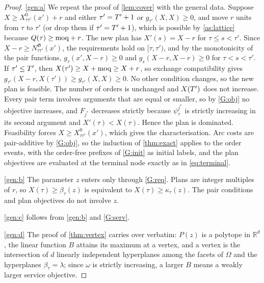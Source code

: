 \begin{proof}
  \ref{gen:a} We repeat the proof of \cref{lem:cover} with the general data. Suppose
  $X\ge X^0_{\tau\tau'}(x')+r$ and either $\tau'=T'+1$ or $g_{\tau'}(X,X)\ge0$, and move $r$
  units from $\tau$ to $\tau'$ (or drop them if $\tau'=T'+1$), which is possible by
  \cref{as:lattice} because $Q(\tau)\ge\mathrm{moq}+r$. The new plan has $X'(s)=X-r$ for
  $\tau\le s<\tau'$. Since $X-r\ge N^{\mathfrak{G}}_{\tau\tau'}(x')$, the requirements hold on
  $[\tau,\tau')$, and by the monotonicity of the pair functions,
  $g_\tau(x',X-r)\ge0$ and $g_s(X-r,X-r)\ge0$ for $\tau<s<\tau'$. If $\tau'\le T'$, then
  $X(\tau')\ge X+\mathrm{moq}\ge X+r$, so exchange compatibility gives
  $g_{\tau'}(X-r,X(\tau'))\ge g_{\tau'}(X,X)\ge0$. No other condition changes, so the new plan
  is feasible. The number of orders is unchanged and $X(T')$ does not increase. Every pair
  term involves arguments that are equal or smaller, so by \ref{G:obj} no objective
  increases, and $F_{j^\ast}$ decreases strictly because $\psi^{j^\ast}_\tau$ is strictly
  increasing in its second argument and $X'(\tau)<X(\tau)$. Hence the plan is dominated.
  Feasibility forces $X\ge X^0_{\tau\tau'}(x')$, which gives the characterisation. Arc costs
  are pair-additive by \ref{G:obj}, so the induction of \cref{thm:exact} applies to the order
  events, with the order-free prefixes of \ref{G:init} as initial labels, and the plan
  objectives are evaluated at the terminal node exactly as in \eqref{eq:terminal}.

  \ref{gen:b} The parameter $z$ enters only through \ref{G:req}. Plans are integer multiples
  of $r$, so $X(\tau)\ge\beta_\tau(z)$ is equivalent to $X(\tau)\ge\kappa_\tau(z)$. The pair
  conditions and plan objectives do not involve $z$.

  \ref{gen:c} follows from \ref{gen:b} and \ref{G:serv}.

  \ref{gen:d} The proof of \cref{thm:vertex} carries over verbatim: $P(z)$ is a polytope in
  $\mathbb{R}^d$, the linear function $B$ attains its maximum at a vertex, and a vertex is the
  intersection of $d$ linearly independent hyperplanes among the facets of $\Omega$ and the
  hyperplanes $\beta_\tau=\lambda$; since $\omega$ is strictly increasing, a larger $B$ means
  a weakly larger service objective.
\end{proof}

